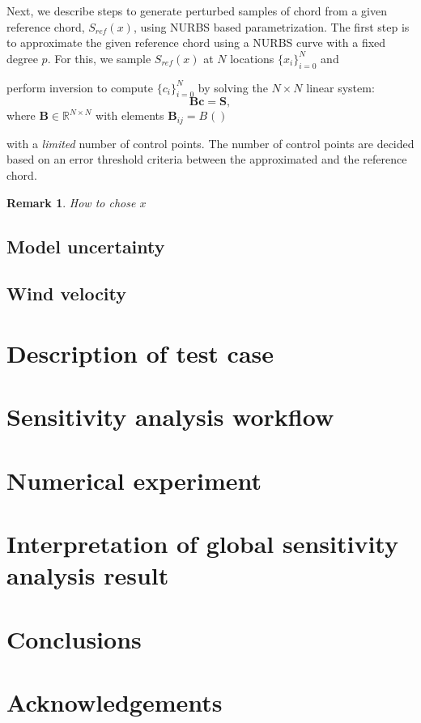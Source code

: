 \documentclass[review]{elsarticle}
\newtheorem{remark}{Remark}[section]
\numberwithin{equation}{section}
\numberwithin{equation}{section}
\begin{document}
Next, we describe steps to generate perturbed samples of chord from a given reference chord, $S_{ref}(x)$, using NURBS based parametrization. The first step is to approximate the given reference chord using a NURBS curve with a fixed degree $p$. For this, we sample $S_{ref}(x)$ at $N$ locations $\{x_i\}_{i=0}^N$ and


 perform inversion to compute $\{c_i\}_{i=0}^N$ by solving the $N\times N$ linear system:
\begin{equation}\label{nurbs_inversion}
\mathbf{B}\mathbf{c} = \mathbf{S},
\end{equation}
where $\mathbf{B}\in \mathbb{R}^{N\times N}$ with elements $\mathbf{B}_{ij} = B_{}()$

with a \emph{limited} number of control points. The number of control points are decided based on an error threshold criteria between the approximated and the reference chord. 
\begin{remark}
How to chose $x$
\end{remark}

\subsection{Model uncertainty}
\subsection{Wind velocity}
\section{Description of test case}
\section{Sensitivity analysis workflow}
\section{Numerical experiment}
\section{Interpretation of global sensitivity analysis result}
\section{Conclusions}
\section*{Acknowledgements}
\end{document}
